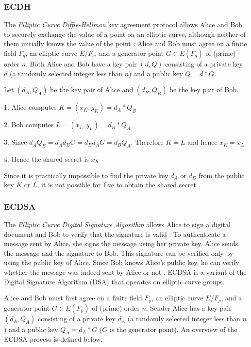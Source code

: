\documentclass[12pt,a4paper]{article}
\begin{document}
\subsubsection{ECDH} \label{ECDH}
The \emph{Elliptic Curve Diffie-Hellman} key agreement protocol allows Alice and Bob 
to securely exchange the value of a point on an elliptic curve, 
although neither of them initially knows the value of the point \cite{anoop2007elliptic,silverman2009arithmetic}: 
Alice and Bob must agree on a finite field $F_q$, an elliptic curve $E/F_q$, and a generator point $G \in E(F_q)$  of (prime) order $n$.
Both Alice and Bob have a key pair $(d,Q)$ consisting of a private key $d$ (a randomly selected integer less than $n$) 
and a public key $Q = d * G$.

Let $(d_A,Q_A)$ be the key pair of Alice and $(d_B,Q_B)$ be the key pair of Bob.

1. Alice computes $K = (x_K,y_K) = d_A * Q_B$

2. Bob computes $L = (x_L,y_L) = d_B * Q_A$

3. Since $d_AQ_B = d_Ad_BG = d_Bd_AG = d_BQ_A$. Therefore $K = L$ and hence $x_K = x_L$

4. Hence the shared secret is $x_K$

Since it is practically impossible to find the private key $d_A$ or $d_B$ from the public key $K$ or $L$, it is not possible for Eve to obtain the shared secret \cite{anoop2007elliptic,silverman2009arithmetic,jurivsic1997elliptic}.

\subsubsection{ECDSA} \label{ECDSA}
The \emph{Elliptic Curve Digital Signature Algorithm} allows Alice to sign a digital document and Bob to verify that the signature is valid \cite{silverman2009arithmetic}:
To authenticate a message sent by Alice, she signs the message using her private key. 
Alice sends the message and the signature to Bob. 
This signature can be verified only by using the public key of Alice. 
Since Bob knows Alice's public key, he can verify whether the message was indeed sent by Alice or not \cite{anoop2007elliptic}.
ECDSA is a variant of the Digital Signature Algorithm (DSA) that operates on elliptic curve groups. 

Alice and Bob must first agree on a finite field $F_p$, an elliptic curve $E/F_p$, and a generator point $G \in E(F_p)$ of (prime) order $n$.
Sender Alice has a key pair $(d_A,Q_A)$ consisting of a private key $d_A$ (a randomly selected integer less than $n$) 
and a public key $Q_A = d_A * G$ ($G$ is the generator point). 
An overview of the ECDSA process is defined below. 
\end{document}
